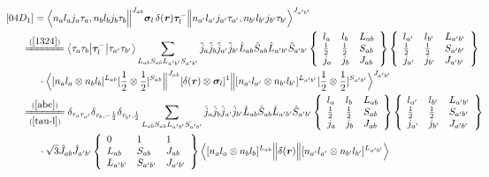 \documentclass[master]{shnuthesis}
\newcommand{\bmr}{\textbf{\textit{r}}}
\newcommand{\ap}{a^\prime}
\newcommand{\bp}{b^\prime}
\newcommand{\il}{\!\!\!\!\!\!\!\!\!\!}
\newcommand{\ii}{\!\!\!\!\!\!\!\!\!\!\!\!\!\!\!\!\!\!\!\!}
\newcommand{\zdydh}{\xlongequal}
\begin{document}
\begin{align}
    &\ii [04D_1] = \Big\langle n_a l_a j_a \tau_a, n_b l_b j_b \tau_b \Big\|^{J_{ab}} \bm{\sigma}_l \,\delta(\bmr) \bm{\tau}_l^- \Big\| n_{\ap} l_{\ap} j_{\ap} \tau_{\ap}, n_{\bp} l_{\bp} j_{\bp} \tau_{\bp} \Big\rangle^{J_{\ap \bp}} \\
    &\il \xlongequal{(\ref{1324})} \big\langle \tau_a\tau_b \big|\bm{\tau}_l^- \big|\tau_{\ap}\tau_{\bp}\big\rangle \sum_{L_{ab}S_{ab}L_{\ap\bp}S_{\ap\bp}} \hat{j}_a\hat{j}_b\hat{j}_{\ap}\hat{j}_{\bp}\hat{L}_{ab}\hat{S}_{ab}\hat{L}_{\ap\bp}\hat{S}_{\ap\bp}  \left\{\begin{array}{lll}l_{a} & l_{b} & L_{ab} \\ \frac{1}{2} & \frac{1}{2} & S_{ab} \\j_{a} & j_{b} & J_{ab} \end{array}\right\}  \left\{\begin{array}{lll}l_{\ap} & l_{\bp} & L_{\ap\bp} \\ \frac{1}{2} & \frac{1}{2} & S_{\ap\bp} \\j_{\ap} & j_{\bp} & J_{\ap\bp} \end{array}\right\}  \notag \\
    & \cdot \Big\langle [n_a l_a \otimes n_b l_b]^{L_{ab}} [\frac{1}{2}\otimes\frac{1}{2}]^{S_{ab}} \Big\|^{J_{ab}} [\delta(\bmr) \otimes \bm{\sigma}_l]^1 \Big\| [n_{\ap} l_{\ap} \otimes n_{\bp} l_{\bp}]^{L_{\ap\bp}} [\frac{1}{2}\otimes\frac{1}{2}]^{S_{\ap\bp}} \Big\rangle^{J_{\ap \bp}} \\
    &\il \zdydh[(\ref{tau-l})]{(\ref{abc})} \delta_{\tau_a \tau_{\ap}}\delta_{\tau_b, -\frac{1}{2}}\delta_{\tau_{\bp}, \frac{1}{2}} \sum_{L_{ab}S_{ab}L_{\ap\bp}S_{\ap\bp}} \hat{j}_a\hat{j}_b\hat{j}_{\ap}\hat{j}_{\bp}\hat{L}_{ab}\hat{S}_{ab}\hat{L}_{\ap\bp}\hat{S}_{\ap\bp}  \left\{\begin{array}{lll}l_{a} & l_{b} & L_{ab} \\ \frac{1}{2} & \frac{1}{2} & S_{ab} \\j_{a} & j_{b} & J_{ab} \end{array}\right\}  \left\{\begin{array}{lll}l_{\ap} & l_{\bp} & L_{\ap\bp} \\ \frac{1}{2} & \frac{1}{2} & S_{\ap\bp} \\j_{\ap} & j_{\bp} & J_{\ap\bp} \end{array}\right\}  \notag \\
    & \cdot \sqrt{3}\hat{J}_{ab}\hat{J}_{\ap\bp}  \left\{\begin{array}{lll} 0 & 1 & 1 \\ L_{ab} & S_{ab} & J_{ab} \\ L_{\ap\bp} & S_{\ap\bp} & J_{\ap\bp} \end{array}\right\}  \Big\langle [n_a l_a \otimes n_b l_b]^{L_{ab}} \Big\| \delta(\bmr) \Big\| [n_{\ap} l_{\ap} \otimes n_{\bp} l_{\bp}]^{L_{\ap\bp}} \Big\rangle  \notag\\

\end{align}
\end{document}
